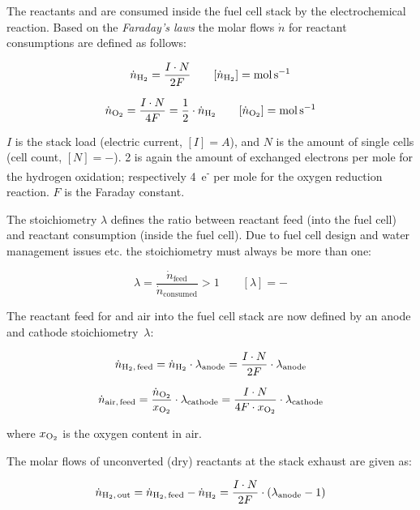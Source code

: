 \documentclass[11pt,a4paper,english,twoside]{scrreprt}
\begin{document}
The reactants  and  are consumed inside the fuel cell stack by the electrochemical reaction. Based on the \textit{Faraday's laws} the molar flows $\dot{n}$ for reactant consumptions are defined as follows:

\begin{equation}
  \label{eqn:n_H2_consumed}
  \dot{n}_{\ce{H2}} = \frac{I\cdot N}{2F} \qquad [\dot{n}_{\ce{H2}}]=\si{\mole\per\second}
\end{equation}

\[\dot n_{\ce{O2}} =\frac{I\cdot N}{4F} =\frac 12 \cdot \dot{n}_{\ce{H2}} \qquad [\dot{n}_{\ce{O2}}]=\si{\mole\per\second}\]

$I$ is the stack load (electric current, $[I]=A$), and $N$ is the amount of single cells (cell count, $[N]=-$). 2 is again the amount of exchanged electrons per mole  for the hydrogen oxidation; respectively 4~e\textsuperscript{-} per mole  for the oxygen reduction reaction. $F$ is the Faraday constant.

The stoichiometry $\lambda$ defines the ratio between reactant feed (into the fuel cell) and reactant consumption (inside the fuel cell). Due to fuel cell design and water management issues etc. the stoichiometry must always be more than one:

\[\lambda =\frac{\dot{n}_{\text{feed}}}{\dot{n}_{\text{consumed}}} > 1 \qquad [\lambda] = -\]


The reactant feed for  and air into the fuel cell stack are now defined by an anode and cathode stoichiometry~$\lambda$:

\begin{equation}
  \label{eqn:n_H2_feed}
  \dot n_{\ce{H2},\,\text{feed}} = \dot n_{\ce{H2}} \cdot \lambda_{\text{anode}} = \frac{I\cdot N}{2F} \cdot \lambda _{\text{anode}}
\end{equation}

\[
\dot n_{\text{air,\,feed}} = \frac{\dot n_{\ce{O2}}}{x_{\ce{O2}}} \cdot \lambda _{\text{cathode}}= \frac{I\cdot N}{4F\cdot x_{\ce{O2}}} \cdot \lambda _{\text{cathode}}
\]

where $x_{\ce{O2}}$ is the oxygen content in air.



The molar flows of unconverted (dry) reactants at the stack exhaust are given as:

\[\dot{n}_{\ce{H2},\,\text{out}} =\dot{n}_{\ce{H2},\,\text{feed}} -\dot{n}_{\ce{H2}} =\frac{I\cdot N}{2F} \cdot (\lambda_{\text{anode}} -1)\]
\end{document}
